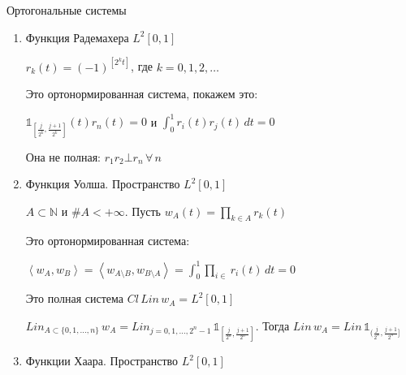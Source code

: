 \begin{example}
    Ортогональные системы

    \begin{enumerate}
        \item {
            Функция Радемахера $L^2 [0, 1]$

            $r_k (t) = (-1)^{[2^k t]}$, где $k = 0, 1, 2, \ldots$

            Это ортонормированная система, покажем это:

            $\mathds{1}_{[\frac{j}{2^k}, \frac{j + 1}{2^k}]} (t) r_n (t) = 0$ и $\int_{0}^1 r_i (t) r_j (t) \, dt = 0$

            Она не полная: $r_1r_2 \bot r_n \, \forall \, n$
        }
        \item {
            Функция Уолша. Пространство $L^2 [0, 1]$

            $A \subset \mathbb{N}$ и $\#A < +\infty$. Пусть $w_A (t) = \prod\limits_{k \in A} r_k (t)$

            Это ортонормированная система:

            $\left < w_A, w_B \right > = \left < w_{A \setminus B} , w_{B \setminus A} \right > = 
            \int_0^1 \prod_{i \in } r_i (t) \, dt = 0$

            Это полная система $Cl \, Lin \, w_A = L^2 [0, 1]$

            $Lin_{A \subset \{ 0, 1, \ldots, n \}} \,  w_A = Lin_{j = 0, 1, \ldots, 2^n - 1} \, \mathds{1}_{[\frac{j}{2^n}, \frac{j + 1}{2^n}]}$. 
            Тогда $Lin \, w_A = Lin \, \mathds{1}_{(\frac{j}{2^n}, \frac{j + 1}{2^n}]}$
        }
        \item {
            Функции Хаара. Пространство $L^2 [0, 1]$

}
\end{enumerate}
\end{example}
